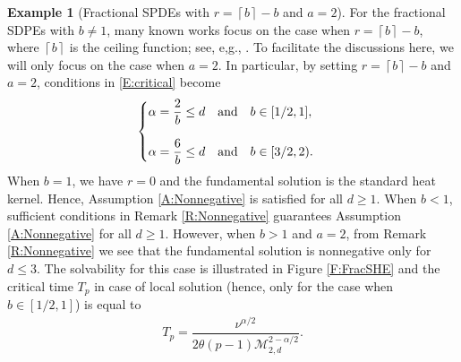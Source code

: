 \documentclass[12pt]{report}
\theoremstyle{plain}
\theoremstyle{definition}
\newtheorem{example}[theorem]{Example}
\numberwithin{equation}{section}
\newcommand{\Ceil}[1]{\left\lceil #1 \right\rceil}
\begin{document}
\begin{example}[Fractional SPDEs with $r=\Ceil{b}-b$ and $a=2$] \label{Eg:FracSHE}
	For the fractional SDPEs with $b\ne 1$, many known works focus on the case when $r=\Ceil{b}-b$,
	where $\Ceil{b}$ is the ceiling function; see, e,g., \cite{chen:17:nonlinear, mijena.nane:15:space-time}. To
	facilitate the discussions here, we will only focus on the case when $a=2$. In particular, by
	setting $r=\Ceil{b}-b$ and $a=2$, conditions in \eqref{E:critical} become
	\begin{align} \label{E:CrFrSHE}
	\begin{cases}
	\displaystyle \alpha =\frac{2}{b} \le d \quad  \text{and} \quad b\in [1/2,1], \bigskip\\
	\displaystyle \alpha =\frac{6}{b} \le d \quad  \text{and} \quad b\in [3/2,2).
	\end{cases}
	\end{align}
	When $b=1$, we have $r=0$ and the fundamental solution is the standard heat kernel. Hence,
	Assumption \ref{A:Nonnegative} is satisfied for all $d\ge 1$. When $b<1$, sufficient conditions in
	Remark \ref{R:Nonnegative} guarantees Assumption \ref{A:Nonnegative} for all $d\ge 1$. However,
	when $b>1$ and $a=2$, from Remark \ref{R:Nonnegative} we see that the fundamental solution is
	nonnegative only for $d\le 3$. The solvability for this case is illustrated in Figure
	\ref{F:FracSHE} and the critical time $T_p$ in case of local solution (hence, only for the case
	when $b\in[1/2,1]$) is equal to
	\begin{align} \label{E:TpFracSHE}
	T_p = \dfrac{\nu^{\alpha/2}}{2 \theta (p-1) \mathcal{M}_{2,d}^{2-\alpha/2}}.
	\end{align}
\end{example}
\end{document}
